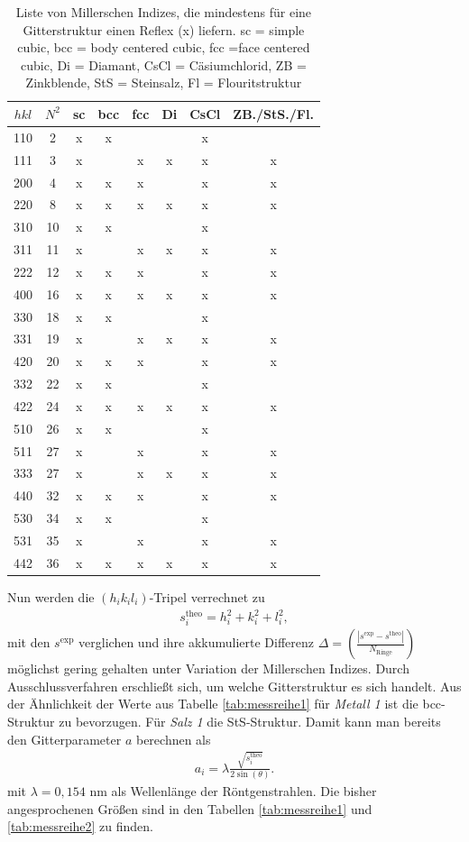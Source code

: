 \begin{table}[t]
\begin{tabular}{cc|cccccc}
 $hkl$&$N^2$& sc &bcc & fcc & Di & CsCl &ZB./StS./Fl.\\
 \hline
 110&2&x&x&&&x&\\
 111&3&x&&x&x&x&x\\
 200&4&x&x&x&&x&x\\
 220&8&x&x&x&x&x&x\\
 310&10&x&x&&&x&\\
 311&11&x&&x&x&x&x\\
 222&12&x&x&x&&x&x\\
 400&16&x&x&x&x&x&x\\
 330&18&x&x&&&x&\\
 331&19&x&&x&x&x&x\\
 420&20&x&x&x&&x&x\\
 332&22&x&x&&&x&\\
 422&24&x&x&x&x&x&x\\
 510&26&x&x&&&x&\\
 511&27&x&&x&&x&x\\
 333&27&x&&x&x&x&x\\
 440&32&x&x&x&&x&x\\
 530&34&x&x&&&x&\\
 531&35&x&&x&&x&x\\
 442&36&x&x&x&x&x&x\\
\end{tabular}
\caption{Liste von Millerschen Indizes, die mindestens für eine Gitterstruktur einen Reflex (x) liefern. sc = simple cubic, bcc = body centered cubic, fcc =face centered cubic,
 Di = Diamant, CsCl = Cäsiumchlorid, ZB = Zinkblende, StS = Steinsalz, Fl = Flouritstruktur}
\label{tab:hklstrukturen}
\end{table}
\noindent  Nun werden die $(h_ik_il_i)$-Tripel
verrechnet zu
\begin{align}
 s^\text{theo}_i = h_i^2 + k_i^2 + l_i^2,
 \label{eq:structTheo}
\end{align}
mit den $s^\text{exp}$ verglichen und ihre akkumulierte Differenz $\Delta=\left(\frac{|s^\text{exp}-s^\text{theo}|}{N_\text{Ringe}}\right)$ möglichst gering gehalten unter Variation der Millerschen Indizes. Durch Ausschlussverfahren 
erschließt sich, um welche Gitterstruktur es sich handelt. Aus der Ähnlichkeit der Werte
aus Tabelle \ref{tab:messreihe1} für \textit{Metall 1} ist die bcc-Struktur zu bevorzugen. Für \textit{Salz 1} die StS-Struktur.
Damit kann man bereits den Gitterparameter $a$ berechnen als
\begin{align}
 a_i = \lambda\frac{\sqrt{s^\text{theo}_i}}{2\sin(\theta)}.
 \label{eq:gitterparameter}
\end{align}
mit $\lambda=0,154$ nm als Wellenlänge der Röntgenstrahlen. Die bisher angesprochenen Größen sind in den Tabellen 
\ref{tab:messreihe1} und \ref{tab:messreihe2} zu finden.


